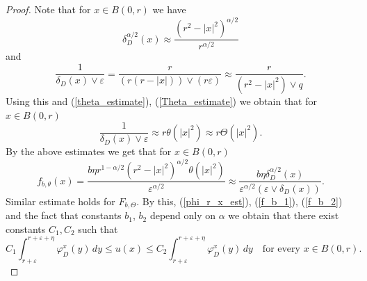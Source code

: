 \documentclass[a4paper,12pt,reqno]{amsart}
\theoremstyle{definition}
\theoremstyle{remark}
\newcommand{\eps}{\varepsilon}
\begin{document}
\begin{proof}
Note that for $x \in B(0,r)$ we have
$$
\delta_D^{\alpha/2}(x) \approx \frac{(r^2 - |x|^2)^{\alpha/2}}{r^{\alpha/2}}
$$
and
$$
\frac{1}{\delta_D(x) \vee \eps} = \frac{r}{(r(r-|x|)) \vee (r \eps)} \approx \frac{r}{(r^2 - |x|^2) \vee q}.
$$
Using this and (\ref{theta_estimate}), (\ref{Theta_estimate}) we obtain that for $x \in B(0,r)$
$$
\frac{1}{\delta_D(x) \vee \eps} \approx r \theta(|x|^2) \approx r \Theta(|x|^2).  
$$
By the above estimates we get that for $x \in B(0,r)$
$$
f_{b,\theta}(x) = \frac{b \eta r^{1- \alpha/2} (r^2 - |x|^2)^{\alpha/2} \theta(|x|^2)}{\eps^{\alpha/2}} 
\approx \frac{b \eta \delta_D^{\alpha/2}(x)}{\eps^{\alpha/2} (\eps \vee \delta_D(x))}.
$$
Similar estimate holds for $F_{b,\Theta}$. By this, (\ref{phi_r_x_est}), (\ref{f_b_1}), (\ref{f_b_2}) and the fact that constants $b_1$, $b_2$ depend only on $\alpha$ we obtain that there exist constants $C_1, C_2$ such that
$$
C_1 \int_{r+\eps}^{r+\eps+\eta} \varphi_D^x(y) \, dy \le u(x) \le C_2 \int_{r+\eps}^{r+\eps+\eta} \varphi_D^x(y) \, dy \quad \text{for every $x \in B(0,r)$.}
$$
\end{proof}
\end{document}
